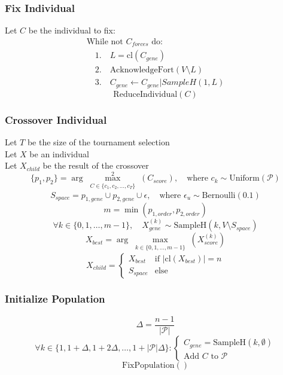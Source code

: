 \documentclass[11pt]{article}
\begin{document}
\subsubsection{Fix Individual}

Let $C$ be the individual to fix:
$$\begin{array}{ll}
\text{While not } C_{forces} \text{ do:} \\
\quad 1. \quad L = \text{cl}(C_{gene}) \\
\quad 2. \quad \text{AcknowledgeFort}(V \setminus L) \\
\quad 3. \quad C_{gene} \leftarrow C_{gene} | SampleH(1, L)
\end{array}$$
$$\text{ReduceIndividual}(C)$$

\subsubsection{Crossover Individual}

Let $T$ be the size of the tournament selection \\
Let $X$ be an individual \\
Let $X_{child}$ be the result of the crossover \\

$$\{p_1, p_2\} = \arg \overset{2}{\max_{\substack{C \in \{c_1, c_2, \dots, c_T\}}}}(C_{score}), \quad \text{where } c_k \sim \text{Uniform}(\mathcal{P})$$
$$S_{space} = p_{1,gene} \cup p_{2,gene} \cup \epsilon, \quad \text{where } \epsilon_u \sim \text{Bernoulli}(0.1)$$
$$m = \min(p_{1,order}, p_{2,order})$$
$$\forall k \in \{0, 1, \dots, m - 1\}, \quad X_{gene}^{(k)} \sim \text{SampleH}(k, V \setminus S_{space})$$
$$X_{best} = \arg \max_{\substack{k \in \{0, 1, \dots, m - 1\}}}(X_{score}^{(k)})$$
$$X_{child} = \begin{cases}
    X_{best} & \text{if } |\text{cl}(X_{best})| = n \\
    S_{space} & \text{else}
\end{cases}$$

\subsubsection{Initialize Population}

$$\Delta = \frac{n-1}{|\mathcal{P}|}$$
$$\forall k \in \{1, 1+\Delta, 1+2\Delta, \dots, 1+|\mathcal{P}|\Delta\}: \begin{cases}
C_{gene} = \text{SampleH}(k, \emptyset) \\
\text{Add } C \text{ to } \mathcal{P}
\end{cases}$$
$$\text{FixPopulation}()$$
\end{document}
